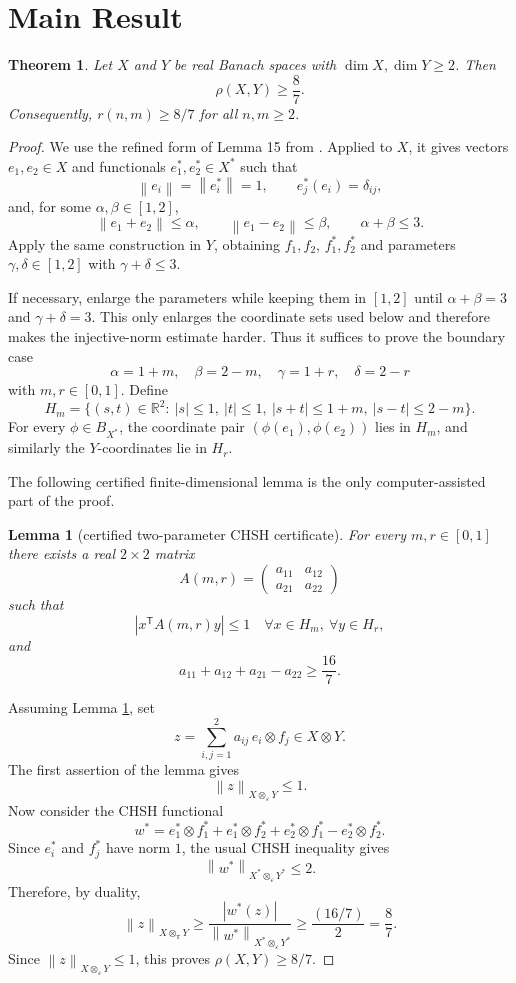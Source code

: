\documentclass[11pt]{article}
\newtheorem{theorem}{Theorem}
\newtheorem{lemma}{Lemma}
\newcommand{\R}{\mathbb{R}}
\newcommand{\eps}{\varepsilon}
\newcommand{\ot}{\otimes}
\newcommand{\abs}[1]{\left|#1\right|}
\newcommand{\norm}[1]{\left\|#1\right\|}
\begin{document}
\section*{Main Result}

\begin{theorem}
\label{thm:eight-sevenths}
Let \(X\) and \(Y\) be real Banach spaces with
\(\dim X,\dim Y\geq 2\).  Then
\[
\rho(X,Y)\geq \frac87 .
\]
Consequently, \(r(n,m)\geq 8/7\) for all \(n,m\geq 2\).
\end{theorem}

\begin{proof}
We use the refined form of Lemma 15 from \cite{ALPSW}.  Applied to \(X\), it
gives vectors \(e_1,e_2\in X\) and functionals
\(e_1^*,e_2^*\in X^*\) such that
\[
\norm{e_i}=\norm{e_i^*}=1,\qquad e_j^*(e_i)=\delta_{ij},
\]
and, for some \(\alpha,\beta\in[1,2]\),
\[
\norm{e_1+e_2}\leq \alpha,\qquad
\norm{e_1-e_2}\leq \beta,\qquad \alpha+\beta\leq 3.
\]
Apply the same construction in \(Y\), obtaining \(f_1,f_2\), \(f_1^*,f_2^*\)
and parameters \(\gamma,\delta\in[1,2]\) with \(\gamma+\delta\leq3\).

If necessary, enlarge the parameters while keeping them in \([1,2]\) until
\(\alpha+\beta=3\) and \(\gamma+\delta=3\).  This only enlarges the coordinate
sets used below and therefore makes the injective-norm estimate harder.  Thus
it suffices to prove the boundary case
\[
\alpha=1+m,\quad \beta=2-m,\quad
\gamma=1+r,\quad \delta=2-r
\]
with \(m,r\in[0,1]\).  Define
\[
H_m=\{(s,t)\in\R^2:\ |s|\leq1,\ |t|\leq1,\ |s+t|\leq1+m,\ |s-t|\leq2-m\}.
\]
For every \(\phi\in B_{X^*}\), the coordinate pair
\((\phi(e_1),\phi(e_2))\) lies in \(H_m\), and similarly the \(Y\)-coordinates
lie in \(H_r\).

The following certified finite-dimensional lemma is the only computer-assisted
part of the proof.

\begin{lemma}[certified two-parameter CHSH certificate]
\label{lem:certificate}
For every \(m,r\in[0,1]\) there exists a real \(2\times2\) matrix
\[
A(m,r)=\begin{pmatrix}a_{11}&a_{12}\\a_{21}&a_{22}\end{pmatrix}
\]
such that
\[
\abs{x^\mathsf{T}A(m,r)y}\leq 1
\quad\forall x\in H_m,\ \forall y\in H_r,
\]
and
\[
a_{11}+a_{12}+a_{21}-a_{22}\geq\frac{16}{7}.
\]
\end{lemma}

Assuming Lemma \ref{lem:certificate}, set
\[
z=\sum_{i,j=1}^2 a_{ij}\, e_i\ot f_j\in X\ot Y .
\]
The first assertion of the lemma gives
\[
\norm{z}_{X\ot_\eps Y}\leq1.
\]
Now consider the CHSH functional
\[
w^*=e_1^*\ot f_1^*+e_1^*\ot f_2^*
    +e_2^*\ot f_1^*-e_2^*\ot f_2^* .
\]
Since \(e_i^*\) and \(f_j^*\) have norm \(1\), the usual CHSH inequality gives
\[
\norm{w^*}_{X^*\ot_\eps Y^*}\leq2.
\]
Therefore, by duality,
\[
\norm{z}_{X\ot_\pi Y}
\geq \frac{\abs{w^*(z)}}{\norm{w^*}_{X^*\ot_\eps Y^*}}
\geq \frac{(16/7)}{2}=\frac87 .
\]
Since \(\norm{z}_{X\ot_\eps Y}\leq1\), this proves
\(\rho(X,Y)\geq8/7\).
\end{proof}
\end{document}
